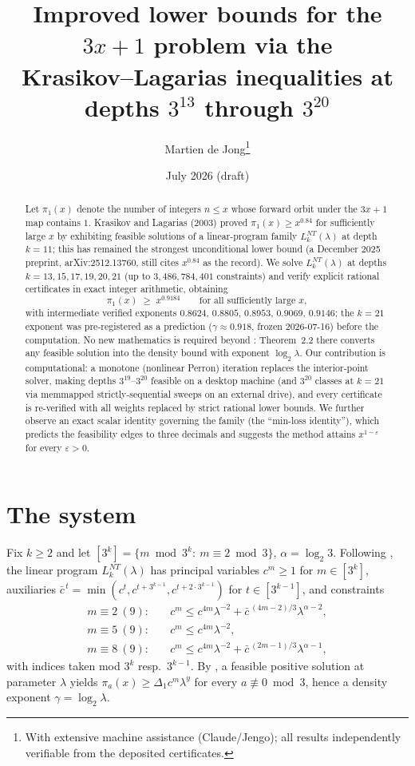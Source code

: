 \documentclass[11pt]{article}
\title{Improved lower bounds for the $3x+1$ problem via the\\ Krasikov--Lagarias inequalities at depths $3^{13}$ through $3^{20}$}
\author{Martien de Jong\thanks{With extensive machine assistance (Claude/Jengo); all results
independently verifiable from the deposited certificates.}}
\date{July 2026 (draft)}
\begin{document}
\maketitle

\begin{abstract}
Let $\pi_1(x)$ denote the number of integers $n\le x$ whose forward orbit under the $3x+1$ map
contains $1$. Krasikov and Lagarias (2003) proved $\pi_1(x)\ge x^{0.84}$ for sufficiently large
$x$ by exhibiting feasible solutions of a linear-program family $L_k^{NT}(\lambda)$ at depth
$k=11$; this has remained the strongest unconditional lower bound (a December 2025 preprint,
arXiv:2512.13760, still cites $x^{0.84}$ as the record). We solve $L_k^{NT}(\lambda)$
at depths $k=13,15,17,19,20,21$ (up to $3{,}486{,}784{,}401$ constraints) and verify explicit
rational certificates in exact integer arithmetic, obtaining
\[
\pi_1(x)\;\ge\; x^{0.9184}\qquad\text{for all sufficiently large }x,
\]
with intermediate verified exponents $0.8624$, $0.8805$, $0.8953$, $0.9069$, $0.9146$; the
$k=21$ exponent was pre-registered as a prediction ($\gamma\approx0.918$, frozen 2026-07-16)
before the computation. No new mathematics is
required beyond \cite{KL}: Theorem~2.2 there converts any feasible solution into the density
bound with exponent $\log_2\lambda$. Our contribution is computational: a monotone (nonlinear
Perron) iteration replaces the interior-point solver, making depths $3^{19}$--$3^{20}$ feasible
on a desktop machine (and $3^{20}$ classes at $k=21$ via memmapped strictly-sequential sweeps
on an external drive), and every certificate is re-verified with all weights replaced by strict
rational lower bounds. We further observe an exact scalar identity governing the family
(the ``min-loss identity''), which predicts the feasibility edges to three decimals and
suggests the method attains $x^{1-\varepsilon}$ for every $\varepsilon>0$.
\end{abstract}

\section{The system}
Fix $k\ge 2$ and let $[3^k]=\{m \bmod 3^k:\ m\equiv 2 \bmod 3\}$, $\alpha=\log_2 3$.
Following \cite[\S2]{KL}, the linear program $L_k^{NT}(\lambda)$ has principal variables
$c^m\ge 1$ for $m\in[3^k]$, auxiliaries
$\bar c^{\,t}=\min(c^{t},c^{t+3^{k-1}},c^{t+2\cdot 3^{k-1}})$ for $t\in[3^{k-1}]$, and
constraints
\begin{align}
m\equiv 2\ (9):\quad & c^m \le c^{4m}\lambda^{-2}+\bar c^{\,(4m-2)/3}\lambda^{\alpha-2},\\
m\equiv 5\ (9):\quad & c^m \le c^{4m}\lambda^{-2},\\
m\equiv 8\ (9):\quad & c^m \le c^{4m}\lambda^{-2}+\bar c^{\,(2m-1)/3}\lambda^{\alpha-1},
\end{align}
with indices taken mod $3^k$ resp.\ $3^{k-1}$. By \cite[Thm.~2.2]{KL}, a feasible positive
solution at parameter $\lambda$ yields $\pi_a(x)\ge \Delta_1 c^m \lambda^{y}$ for every
$a\not\equiv 0 \bmod 3$, hence a density exponent $\gamma=\log_2\lambda$.
\end{document}
